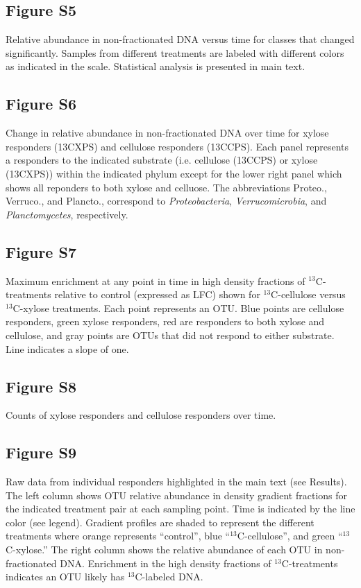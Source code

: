 \subsection{Figure S5}
Relative abundance in non-fractionated DNA versus time for classes that changed significantly.
Samples from different treatments are labeled with different colors as
indicated in the scale. Statistical analysis is presented in main text.

\subsection{Figure S6}
Change in relative abundance in non-fractionated DNA over time for xylose
responders (13CXPS) and cellulose responders (13CCPS). Each panel represents
a responders to the indicated substrate (i.e. cellulose (13CCPS) or xylose (13CXPS)) 
within the indicated phylum except for the lower right panel which shows all reponders to both
xylose and celluose. The abbreviations Proteo., Verruco., and Plancto.,
correspond to \textit{Proteobacteria}, \textit{Verrucomicrobia}, and \textit{Planctomycetes},
respectively.

\subsection{Figure S7}
Maximum enrichment at any point in time in high density fractions
of $^{13}$C-treatments relative to control (expressed as LFC) shown
for $^{13}$C-cellulose versus $^{13}$C-xylose treatments. Each point
represents an OTU. Blue points are cellulose responders, green xylose
responders, red are responders to both xylose and cellulose, and gray points
are OTUs that did not respond to either substrate. Line indicates a slope of
one. 

\subsection{Figure S8}
Counts of xylose responders and cellulose responders over time. \subsection{Figure S9}
Raw data from individual responders highlighted in the main text (see
Results). The left column shows OTU relative abundance in density gradient 
fractions for the indicated treatment pair at each sampling point. Time is
indicated by the line color (see legend). Gradient profiles are shaded
to represent the different treatments where orange represents ``control'',
blue ``$^{13}$C-cellulose'', and green ``$^{13}$C-xylose.'' The right column
shows the relative abundance of each OTU in non-fractionated DNA. Enrichment in the
high density fractions of $^{13}$C-treatments indicates an OTU likely
has $^{13}$C-labeled DNA. 

